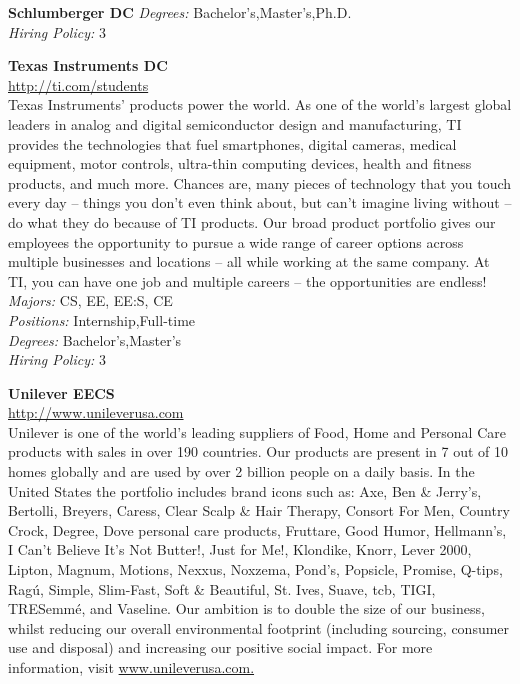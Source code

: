 \documentclass[twoside]{article}
\begin{document}
\begin{center}
\begin{multicols}{2}
\begin{minipage}{.95\columnwidth}{\Large\bf Schlumberger \hfill DC}
    \emph{Degrees:} Bachelor's,Master's,Ph.D.\\
    \emph{Hiring Policy:} 3\\
\end{minipage}
 \begin{minipage}{.95\columnwidth}{\Large\bf Texas Instruments \hfill DC}\\
    \url{http://ti.com/students}\\
    Texas Instruments’ products power the world. As one of the world’s largest global leaders in analog and digital semiconductor design and manufacturing, TI provides the technologies that fuel smartphones, digital cameras, medical equipment, motor controls, ultra-thin computing devices, health and fitness products, and much more. Chances are, many pieces of technology that you touch every day – things you don’t even think about, but can’t imagine living without – do what they do because of TI products. Our broad product portfolio gives our employees the opportunity to pursue a wide range of career options across multiple businesses and locations – all while working at the same company. At TI, you can have one job and multiple careers – the opportunities are endless!\\
    \emph{Majors:} CS, EE, EE:S, CE\\
    \emph{Positions:} Internship,Full-time\\
    \emph{Degrees:} Bachelor's,Master's\\
    \emph{Hiring Policy:} 3\\
\end{minipage}
 \begin{minipage}{.95\columnwidth}{\Large\bf Unilever \hfill EECS}\\
    \url{http://www.unileverusa.com}\\
    Unilever is one of the world’s leading suppliers of Food, Home and Personal Care products with sales in over 190 countries. Our products are present in 7 out of 10 homes globally and are used by over 2 billion people on a daily basis. In the United States the portfolio includes brand icons such as: Axe, Ben \& Jerry’s, Bertolli, Breyers, Caress, Clear Scalp \& Hair Therapy, Consort For Men, Country Crock, Degree, Dove personal care products, Fruttare, Good Humor, Hellmann’s, I Can’t Believe It’s Not Butter!, Just for Me!, Klondike, Knorr, Lever 2000, Lipton, Magnum, Motions, Nexxus, Noxzema, Pond’s, Popsicle, Promise, Q-tips, Ragú, Simple, Slim-Fast, Soft \& Beautiful, St. Ives, Suave, tcb, TIGI, TRESemmé, and Vaseline. Our ambition is to double the size of our business, whilst reducing our overall environmental footprint (including sourcing, consumer use and disposal) and increasing our positive social impact. For more information, visit \url{www.unileverusa.com.}\\

\end{minipage}
\end{multicols}
\end{center}
\end{document}
